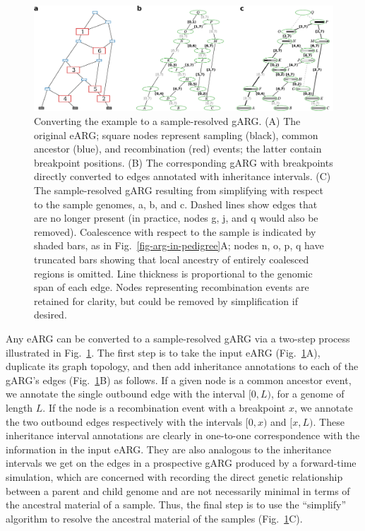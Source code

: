 \documentclass[9pt,twocolumn,twoside]{gsajnl}
\newcommand{\noderef}[1]{\textsf{#1}}
\begin{document}
\begin{figure}
\centering
\includegraphics[width=\textwidth]{illustrations/ancestry-resolution}
\caption{\label{fig-ancestry-resolution}
Converting the \citet[][Fig.~1]{wiuf1999recombination} example
to a sample-resolved gARG. (A) The original eARG; square nodes
represent sampling (black), common ancestor (blue), and recombination (red) events;
the latter contain breakpoint positions.
(B) The corresponding gARG with breakpoints directly converted to
edges annotated with inheritance intervals.
(C) The sample-resolved gARG resulting from simplifying with respect
to the sample genomes, \noderef{a}, \noderef{b}, and \noderef{c}.
Dashed lines show edges that are
no longer present (in practice, nodes \noderef{g}, \noderef{j}, and \noderef{q} would also be removed).
Coalescence with respect to the sample is indicated by shaded bars, as
in Fig.~\ref{fig-arg-in-pedigree}A; nodes \noderef{n}, \noderef{o}, \noderef{p}, \noderef{q} have truncated
bars showing that local ancestry of entirely coalesced regions is omitted.
Line thickness is proportional to the genomic span of each edge.
Nodes representing recombination events are retained
for clarity, but could be removed by simplification if
desired.
}
\end{figure}

Any eARG can be converted to a sample-resolved gARG
via a two-step process illustrated in Fig.~\ref{fig-ancestry-resolution}.
The first step is to take the input eARG (Fig.~\ref{fig-ancestry-resolution}A),
duplicate its graph topology, and then add inheritance annotations
to each of the gARG's edges (Fig.~\ref{fig-ancestry-resolution}B) as follows.
If a given node is a common ancestor event, we annotate the single
outbound edge with the interval $[0,L)$, for a genome of length $L$. If the
node is a recombination event with a breakpoint $x$, we annotate the two
outbound edges respectively with the intervals $[0, x)$ and $[x, L)$. These
inheritance interval annotations are clearly in one-to-one correspondence with
the information in the input eARG. They are also analogous to the
inheritance intervals we get on the edges in a prospective gARG
produced by a forward-time simulation, which are concerned with recording
the direct genetic relationship between a parent and child genome and are not
necessarily minimal in terms of the ancestral material of a sample.
Thus, the final step is to use the ``simplify'' algorithm to resolve the
ancestral material of the samples (Fig.~\ref{fig-ancestry-resolution}C).
\end{document}
